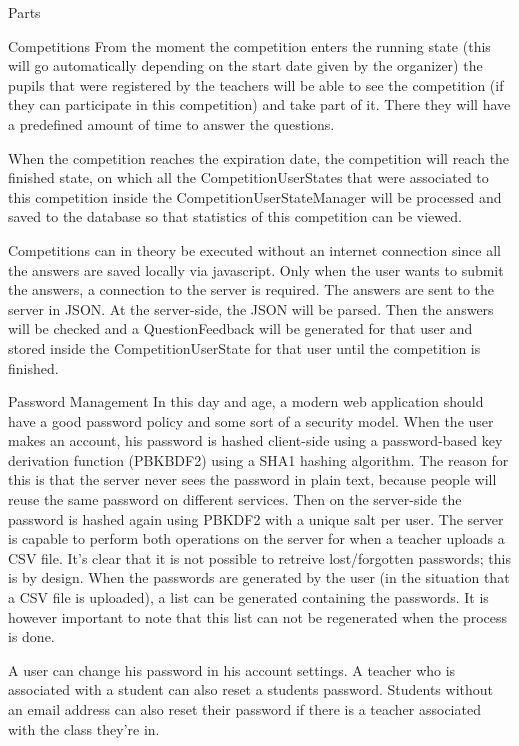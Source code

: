 \documentclass[]{article}
\begin{document}
\begin{section}{Parts}
\begin{subsection}{Competitions}
        From the moment the competition enters the running state (this will go
        automatically depending on the start date given by the organizer) the pupils
        that were registered by the teachers will be able to see the competition (if they can 
        participate in this competition) and take part of it. There they will have a predefined 
        amount of time to answer the questions.
        
        When the competition reaches the expiration date, the competition will reach the
        finished state, on which all the CompetitionUserStates that were associated to
        this competition inside the CompetitionUserStateManager will be processed and
        saved to the database so that statistics of this competition can be viewed.
        
        Competitions can in theory be executed without an internet connection since
        all the answers are saved locally via javascript. Only when the user wants to submit
        the answers, a connection to the server is required. The answers are sent to the
        server in JSON. At the server-side, the JSON will be parsed. Then the answers will
        be checked and a QuestionFeedback will be generated for that user and stored inside
        the CompetitionUserState for that user until the competition is finished.
        
    \end{subsection}
    \begin{subsection}{Password Management}
		In this day and age, a modern web application should have a good password policy and some sort of a security model. When the user makes an account, his password is hashed client-side using a password-based key derivation function (PBKBDF2) using a SHA1 hashing algorithm. The reason for this is that the server 	never sees the password in plain text, because people will reuse the same password on different 		services. Then on the server-side the password is hashed again using PBKDF2 with a unique salt per user. The server is capable to perform both operations on the server for when a teacher uploads a CSV file. It's clear that it is not possible to retreive lost/forgotten passwords; this is by design. When the passwords are generated by the user (in the situation that a CSV file is uploaded), a list can be generated containing the passwords. It is however important to note that this list can not be regenerated when the process is done.
		
		A user can change his password in his account settings. A teacher who is associated with a student 		can also reset a students password. Students without an email address can also reset their password if there 			is a teacher associated with the class they're in.
    \end{subsection} 
    

\end{section}
\end{document}
